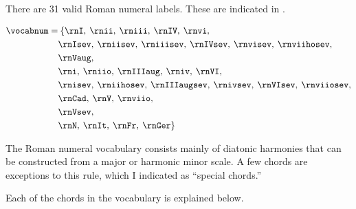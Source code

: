 
There are 31 valid Roman numeral labels. These are indicated
in .


\begin{equation}
    \begin{split}
    \vocabnum = & \: \{ \rnI, \: \rnii, \: \rniii, \: \rnIV, \: \rnvi,\\
                & \rnIsev, \: \rniisev, \: \rniiisev, \: \rnIVsev, \: \rnvisev, \: \rnviihosev,\\
                & \rnVaug,\\
                & \rni, \: \rniio, \: \rnIIIaug, \: \rniv, \: \rnVI,\\ 
                & \rnisev, \: \rniihosev, \: \rnIIIaugsev, \: \rnivsev, \: \rnVIsev, \: \rnviiosev,\\
                & \rnCad, \: \rnV, \: \rnviio,\\
                & \rnVsev,\\
                & \rnN, \: \rnIt, \: \rnFr, \: \rnGer \}
    \end{split}
\end{equation}

The Roman numeral vocabulary consists mainly of diatonic
harmonies that can be constructed from a major or harmonic
minor scale. A few chords are exceptions to this rule, \: which
I indicated as ``special chords.''

Each of the chords in the vocabulary is explained below.


